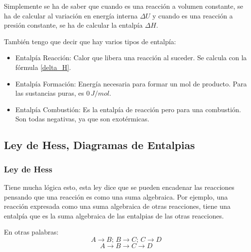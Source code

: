 \documentclass[arial,a4paper,print]{article}
\begin{document}
Simplemente se ha de saber que cuando es una reacción a volumen constante, se ha de calcular al variación en energía interna $\Delta U$ y cuando es una reacción a presión constante, se ha de calcular la entalpía $\Delta H$. 

También tengo que decir que hay varios tipos de entalpía:
\begin{itemize}
\item Entalpía Reacción: Calor que libera una reacción al suceder. Se calcula con la fórmula \ref{delta_H}. 

\item Entalpía Formación: Energía necesaria para formar un mol de producto. Para las sustancias puras, es $0\,\si{J/mol}$. 

\item Entalpía Combustión: Es la entalpía de reacción pero para una combustión. Son todas negativas, ya que son exotérmicas. 
\end{itemize}

\subsection{Ley de Hess, Diagramas de Entalpias}

\subsubsection{Ley de Hess}
Tiene mucha lógica esto, esta ley dice que se pueden encadenar las reacciones pensando que una reacción es como una suma algebraica. Por ejemplo, una reacción expresada como una suma algebraica de otras reacciones, tiene una entalpía que es la suma algebraica de las entalpias de las otras reacciones. 

En otras palabras:
\begin{equation*}
	A \rightarrow B; \, B \rightarrow C; \, C\rightarrow D
\end{equation*}
\begin{equation*}
	A \rightarrow B \rightarrow C \rightarrow D
\end{equation*}
\end{document}
